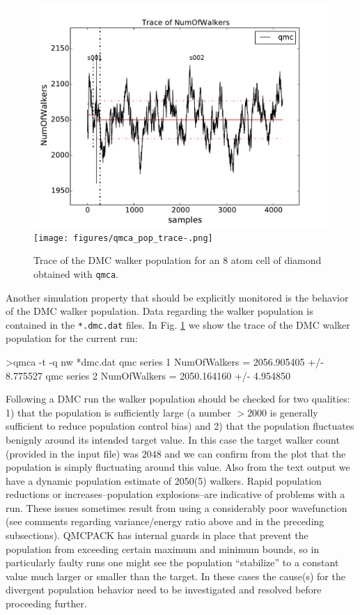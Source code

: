 \begin{figure}
\begin{center}
\ifpdf
\includegraphics[trim = 0mm 0mm 0mm 0mm, clip,width=0.75\columnwidth]{figures/qmca_pop_trace.pdf}
\else
\texttt{[image: figures/qmca\_pop\_trace-.png]}
\fi
\end{center}
\caption{Trace of the DMC walker population for an 8 atom cell of diamond obtained with \texttt{qmca}.}
\label{fig:qmca_pop_trace}
\end{figure}

Another simulation property that should be explicitly monitored  
is the behavior of the DMC walker population.  Data regarding the 
walker population is contained in the \texttt{*.dmc.dat} files.
In Fig. \ref{fig:qmca_pop_trace} we show the trace of the DMC 
walker population for the current run:
\begin{shade}
>qmca -t -q nw *dmc.dat
qmc  series 1  NumOfWalkers          =  2056.905405 +/- 8.775527 
qmc  series 2  NumOfWalkers          =  2050.164160 +/- 4.954850 
\end{shade}
\noindent
Following a DMC run the walker population should be checked for 
two qualities: 1) that the population is sufficiently large (a number 
$>2000$ is generally sufficient to reduce population control bias) and  
2) that the population fluctuates benignly around its intended target 
value. In this case the target walker count (provided in the input file)
was $2048$ and we can confirm from the plot that the population is simply 
fluctuating around this value.  Also from the text output we have a dynamic 
population estimate of 2050(5) walkers.  Rapid population reductions or 
increases--population explosions--are indicative of problems with a run.  
These issues sometimes result from using a considerably poor wavefunction 
(see comments regarding variance/energy ratio above and in the preceding 
subsections).  QMCPACK has internal guards in place that prevent 
the population from exceeding certain maximum and minimum bounds, so 
in particularly faulty runs one might see the population ``stabilize'' 
to a constant value much larger or smaller than the target.  In these 
cases the cause(s) for the divergent population behavior need to 
be investigated and resolved before proceeding further.




